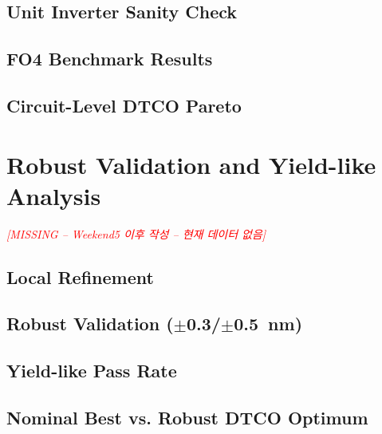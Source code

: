 \documentclass[journal]{IEEEtran}
\newcommand{\missing}[1]{\textcolor{red}{\textit{[MISSING -- #1]}}}
\begin{document}
\subsection{Unit Inverter Sanity Check}

\subsection{FO4 Benchmark Results}

\subsection{Circuit-Level DTCO Pareto}

\section{Robust Validation and Yield-like Analysis}
\label{sec:robust}

\missing{Weekend5 이후 작성 -- 현재 데이터 없음}

\subsection{Local Refinement}

\subsection{Robust Validation ($\pm$0.3/$\pm$0.5~nm)}

\subsection{Yield-like Pass Rate}

\subsection{Nominal Best vs. Robust DTCO Optimum}

\end{document}
